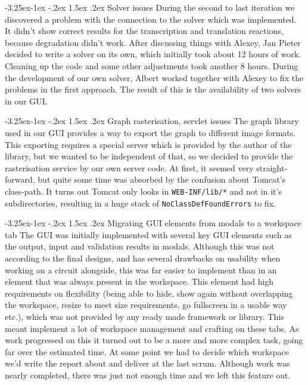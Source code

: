 \documentclass[a4paper]{article}
\makeatletter
\renewcommand\paragraph{\@startsection{paragraph}{4}{\z@}%
  {-3.25ex\@plus -1ex \@minus -.2ex}%
  {1.5ex \@plus .2ex}%
  {\normalfont\normalsize\bfseries}}
\makeatother
\begin{document}
\paragraph{Solver issues}
During the second to last iteration we discovered a problem with the connection to the solver which was implemented. It didn't show correct results for the transcription and translation reactions, because degradation didn't work. After discussing things with Alexey, Jan Pieter decided to write a solver on its own, which initially took about 12 hours of work. Cleaning up the code and some other adjustments took another 8 hours.
During the development of our own solver, Albert worked together with Alexey to fix the problems in the first approach. The result of this is the availability of two solvers in our GUI.

\paragraph{Graph rasterisation, servlet issues}
The graph library used in our GUI provides a way to export the graph to different image formats. This exporting requires a special server which is provided by the author of the library, but we wanted to be independent of that, so we decided to provide the rasterisation service by our own server code.
At first, it seemed very straight-forward, but quite some time was absorbed by the confusion about Tomcat's class-path. It turns out Tomcat only looks in \verb|WEB-INF/lib/*| and not in it's subdirectories, resulting in a huge stack of \verb|NoClassDefFoundErrors| to fix.

\paragraph{Migrating GUI elements from modals to a workspace tab}
The GUI was initially implemented with several key GUI elements such as the output, input and validation results in modals. Although this was not according to the final designs, and has several drawbacks on usability when working on a circuit alongside, this was far easier to implement than in an element that was always present in the workspace. This element had high requirements on flexibility (being able to hide, show again without overlapping the workspace, resize to meet size requirements, go fullscreen in a usable way etc.), which was not provided by any ready made framework or library. This meant implement a lot of workspace management and crafting on these tabs. As work progressed on this it turned out to be a more and more complex task, going far over the estimated time. At some point we had to decide which workspace we'd write the report about and deliver at the last scrum. Although work was nearly completed, there was just not enough time and we left this feature out.


\end{document}
